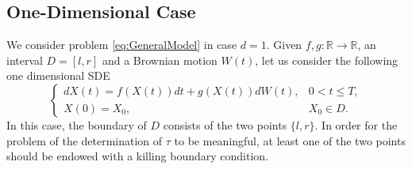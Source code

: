 \subsection{One-Dimensional Case}
We consider problem \eqref{eq:GeneralModel} in case $d = 1$. Given $f,g \colon \mathbb{R} \rightarrow \mathbb{R}$, an interval $D = \left[l,r\right]$ and a Brownian motion $W(t)$, let us consider the following one dimensional SDE
\begin{equation}\label{eq:OneDModel}
\begin{cases}
	dX(t) = f(X(t)) dt + g(X(t))dW(t), & 0 < t \leq T, \\
	X(0)  = X_0, & X_0 \in D.
\end{cases}
\end{equation}
In this case, the boundary of $D$ consists of the two points $\{l,r\}$. In order for the problem of the determination of $\tau$ to be meaningful, at least one of the two points should be endowed with a killing boundary condition. 



